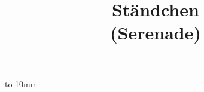 \documentclass{article}         %
\begin{document}


\def\interstaffline{\vskip1mm}
\def\interscoreline{\vskip2mm}
\vbox to 10mm{\vss}
\title{St\"andchen\normalsize\\[2ex](Serenade)}
\maketit

\end{document}
